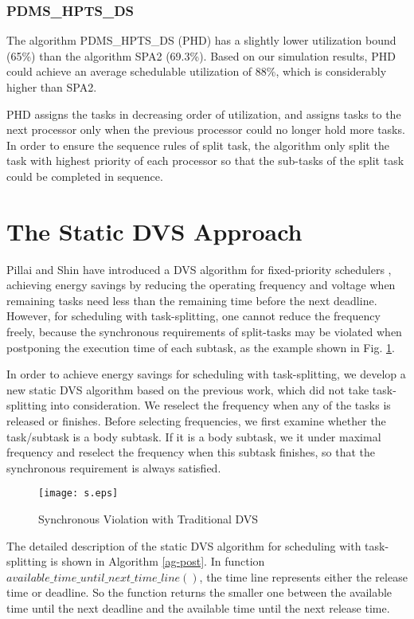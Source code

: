 \documentclass[12pt, journal,compsoc]{IEEEtran}
\begin{document}
\subsubsection{PDMS\_HPTS\_DS}
The algorithm PDMS\_HPTS\_DS (PHD) \cite{Lakshmanan:2009:PFP:1581378.1581523} has a slightly lower utilization bound (65\%) than the algorithm SPA2 (69.3\%). Based on our simulation results, PHD could achieve an average schedulable utilization of 88\%, which is considerably higher than SPA2.


PHD assigns the tasks in decreasing order of utilization, and assigns tasks to the next processor only when the previous processor could no longer hold more tasks. In order to ensure the sequence rules of split task, the algorithm only split the task with highest priority of each processor so that the sub-tasks of the split task could be completed in sequence.

\section{The Static DVS Approach}
\label{post}

Pillai and Shin have introduced a DVS algorithm for fixed-priority schedulers \cite{Pillai:2001:RDV:502034.502044}, achieving energy savings by reducing the operating frequency and voltage when remaining tasks need less than the remaining time before the next deadline. However, for scheduling with task-splitting, one cannot reduce the frequency freely, because the synchronous requirements of split-tasks may be violated when postponing the execution time of each subtask, as the example shown in Fig. \ref{SVTD}.

In order to achieve energy savings for scheduling with task-splitting, we develop a new static DVS algorithm based on the previous work, which did not take task-splitting into consideration. We reselect the frequency when any of the tasks is released or finishes.
Before selecting frequencies, we first examine whether the task/subtask is a body subtask. If it is a body subtask, we   it under maximal frequency and reselect the frequency when this subtask finishes, so that the synchronous requirement is always satisfied.

\begin{figure}[t]
\centering
\texttt{[image: s.eps]}
\caption{Synchronous Violation with Traditional DVS}
\label{SVTD}
\end{figure}

The detailed description of the static DVS algorithm for scheduling with task-splitting is shown in Algorithm \ref{ag-post}. In function $available\_time\_until\_next\_time\_line()$, the time line represents either the release time or deadline. So the function returns the smaller one between the available time until the next deadline and the available time until the next release time.
\end{document}
